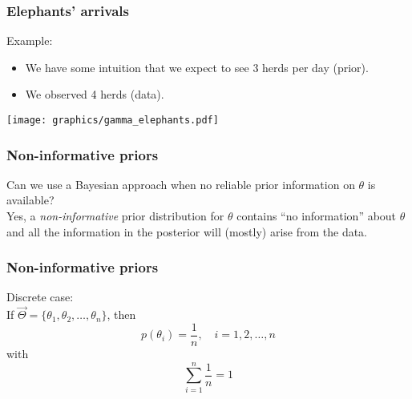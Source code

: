 \documentclass{beamer}
\newcommand{\1}{\ensuremath{\mathbf{1}}}
\begin{document}
%
%
%
\begin{frame}\frametitle{Elephants’ arrivals}
	Example:
	\begin{itemize}
		\item We have some intuition that we expect to see 3 herds per day (prior).
		\item We observed 4 herds (data).
	\end{itemize}
	\begin{center}
		\texttt{[image: graphics/gamma\_elephants.pdf]}
	\end{center}
\end{frame}
%
%
%
\begin{frame}\frametitle{Non-informative priors}
	Can we use a Bayesian approach when no reliable prior information on $\theta$ is available?\\[2ex]
	Yes, a \emph{non-informative} prior distribution for $\theta$ contains ``no information'' about $\theta$ and all the information in the posterior will (mostly) arise from the data.
\end{frame}
%
%
%
\begin{frame}\frametitle{Non-informative priors}
	Discrete case:\\[1.5ex]
	If $\vec\Theta = \{\theta_1, \theta_2, \ldots, \theta_n\}$, then
	\begin{equation}
		p(\theta_i) = \frac{1}{n}, \quad i=1,2,\ldots,n	
	\end{equation}
	with
	\begin{equation}
		\sum_{i=1}^n \frac{1}{n} = 1
	\end{equation}
\end{frame}
%
%
%
\end{document}
